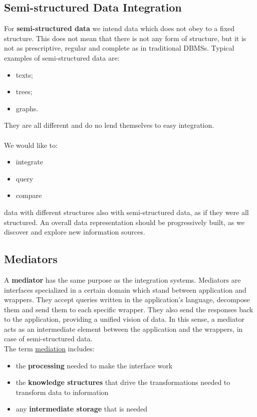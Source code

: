 \documentclass[10pt,a4paper]{article}
\newcommand{\nline}{\\~\\}
\begin{document}
\subsection{Semi-structured Data Integration}
\begin{justify}
For \textbf{semi-structured data} we intend data which does not obey to a fixed structure. This does not mean that there is not any form of structure, but it is not as prescriptive, regular and complete as in traditional DBMSs. Typical examples of semi-structured data are:
\begin{itemize}
	\item texts;
	\item trees;
	\item graphs.
\end{itemize}
They are all different and do no lend themselves to easy integration. \nline
We would like to:
\begin{itemize}
	\item integrate
	\item query
	\item compare
\end{itemize}
data with different structures also with semi-structured data, as if they were all structured. An overall data representation should be progressively built, as we discover and explore new information sources.
\subsection{Mediators}
A \textbf{mediator} has the same purpose as the integration systems. Mediators are interfaces specialized in a certain domain which stand between application and wrappers. They accept queries written in the application’s language, decompose them and send them to each specific wrapper. They also send the responses back to the application, providing a unified vision of data. In this sense, a mediator acts as an intermediate element between the application and the wrappers, in case of semi-structured data.
\\
The term \uline{mediation} includes:
\begin{itemize}
	\item the \textbf{processing} needed to make the interface work
	\item the \textbf{knowledge structures} that drive the transformations needed to transform data to information
	\item any \textbf{intermediate storage} that is needed
\end{itemize}

\end{justify}
\end{document}

